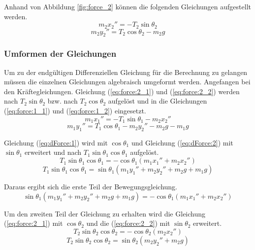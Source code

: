 \documentclass[12pt]{article}
\numberwithin{equation}{subsection}
\begin{document}
Anhand von Abbildung \ref{fig:force_2} können die folgenden Gleichungen aufgestellt werden.
\begin{equation} \label{eq:force:2_1}
	m_2 x_2'' = -T_2\sin\theta_2
\end{equation}
\begin{equation} \label{eq:force:2_2}
	m_2 y_2'' = T_2\cos\theta_2 - m_2 g
\end{equation}

\subsubsection{Umformen der Gleichungen}
Um zu der endgültigen Differenziellen Gleichung für die Berechnung zu gelangen müssen die einzelnen Gleichungen algebraisch umgeformt werden.
Angefangen bei den Kräftegleichungen. Gleichung (\ref{eq:force:2_1}) und (\ref{eq:force:2_2}) werden nach $T_2\sin\theta_2$ bzw. nach $T_2\cos\theta_2$ aufgelöst und in die Gleichungen (\ref{eq:force:1_1}) und (\ref{eq:force:1_2}) eingesetzt.
\begin{equation} \label{eq:dForce:1}
	m_1 x_1'' = -T_1\sin\theta_1 - m_2 x_2''
\end{equation}
\begin{equation} \label{eq:dForce:2}
	m_1 y_1'' = T_1\cos\theta_1 -m_2 y_2'' - m_2 g - m_1 g
\end{equation}

Gleichung (\ref{eq:dForce:1}) wird mit $\cos\theta_1$ und Gleichung (\ref{eq:dForce:2}) mit $\sin\theta_1$ erweitert und nach $T_1\sin\theta_1\cos\theta_1$ aufgelöst.
\begin{equation} \label{eq:thetaForce:1_1}
	T_1\sin\theta_1\cos\theta_1 = -\cos\theta_1(m_1 x_1'' + m_2 x_2'')
\end{equation}
\begin{equation} \label{eq:thetaForce:1_2}
	T_1\sin\theta_1\cos\theta_1 = \sin\theta_1(m_1 y_1'' + m_2 y_2'' + m_2 g + m_1 g)
\end{equation}

Daraus ergibt sich die erste Teil der Bewegungsgleichung.
\begin{equation} \label{eq:motion:1}
	\sin\theta_1(m_1 y_1'' + m_2 y_2'' + m_2 g + m_1 g) = -\cos\theta_1(m_1 x_1'' + m_2 x_2'')
\end{equation}

Um den zweiten Teil der Gleichung zu erhalten wird die Gleichung (\ref{eq:force:2_1}) mit $\cos\theta_2$ und die (\ref{eq:force:2_2}) mit $\sin\theta_2$ erweitert.
\begin{equation} \label{eq:thetaForce:2_1}
	T_2\sin\theta_2\cos\theta_2 = -\cos\theta_2(m_2 x_2'')
\end{equation}
\begin{equation} \label{eq:thetaForce:2_2}
	T_2\sin\theta_2\cos\theta_2 = \sin\theta_2(m_2 y_2'' + m_2 g)
\end{equation}
\end{document}
